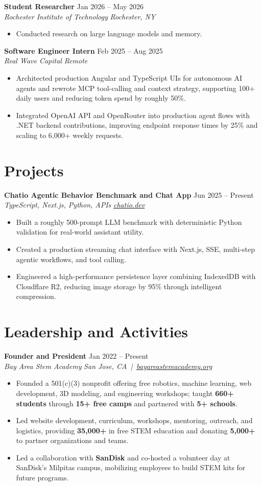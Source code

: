 \documentclass[10pt,letterpaper]{article}
\newif\ifresumeFirstRole
\newcommand{\resumeRole}[4]{%
  \ifresumeFirstRole
    \global\resumeFirstRolefalse
  \else
    \vspace{0pt plus 1fill}%
  \fi
  \textbf{#1} \hfill #2\\
  \textit{#3} \hfill \textit{#4}
}
\begin{document}
\resumeRole{Student Researcher}{Jan 2026 -- May 2026}{Rochester Institute of Technology}{Rochester, NY}
\begin{itemize}
  \item Conducted research on large language models and memory.
\end{itemize}

\resumeRole{Software Engineer Intern}{Feb 2025 -- Aug 2025}{Real Wave Capital}{Remote}
\begin{itemize}
  \item Architected production Angular and TypeScript UIs for autonomous AI agents and rewrote MCP tool-calling and context strategy, supporting 100+ daily users and reducing token spend by roughly 50\%.
  \item Integrated OpenAI API and OpenRouter into production agent flows with .NET backend contributions, improving endpoint response times by 25\% and scaling to 6,000+ weekly requests.
\end{itemize}

\section*{Projects}
\resumeRole{Chatio Agentic Behavior Benchmark and Chat App}{Jun 2025 -- Present}{TypeScript, Next.js, Python, APIs}{\href{https://chatio.dev}{chatio.dev}}
\begin{itemize}
  \item Built a roughly 500-prompt LLM benchmark with deterministic Python validation for real-world assistant utility.
  \item Created a production streaming chat interface with Next.js, SSE, multi-step agentic workflows, and tool calling.
  \item Engineered a high-performance persistence layer combining IndexedDB with Cloudflare R2, reducing image storage by 95\% through intelligent compression.
\end{itemize}

\section*{Leadership and Activities}
\resumeRole{Founder and President}{Jan 2022 -- Present}{Bay Area Stem Academy}{San Jose, CA \,|\, \href{https://bayareastemacademy.org}{bayareastemacademy.org}}
\begin{itemize}
  \item Founded a 501(c)(3) nonprofit offering free robotics, machine learning, web development, 3D modeling, and engineering workshops; taught \textbf{660+ students} through \textbf{15+ free camps} and partnered with \textbf{5+ schools}.
  \item Led website development, curriculum, workshops, mentoring, outreach, and logistics, providing \textbf{\textdollar{}35,000+} in free STEM education and donating \textbf{\textdollar{}5,000+} to partner organizations and teams.
  \item Led a collaboration with \textbf{SanDisk} and co-hosted a volunteer day at SanDisk's Milpitas campus, mobilizing employees to build STEM kits for future programs.
\end{itemize}
\end{document}
